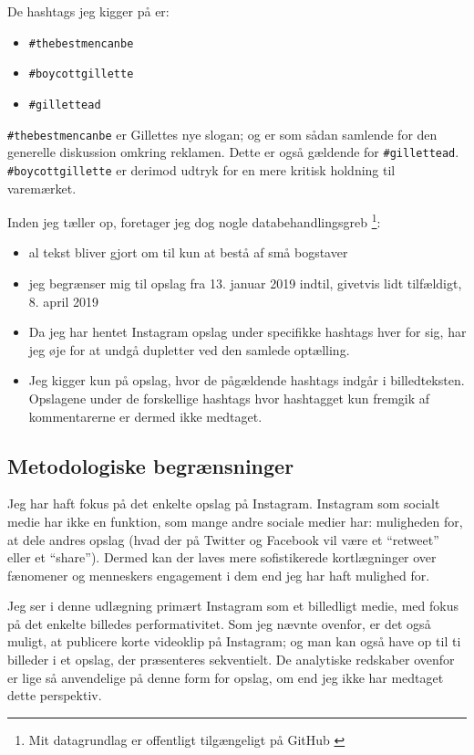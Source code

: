 De hashtags jeg kigger på er:
\begin{itemize}
    \item
        \texttt{\#thebestmencanbe}
    \item
        \texttt{\#boycottgillette}
    \item
        \texttt{\#gillettead}
\end{itemize}
\texttt{\#thebestmencanbe} er Gillettes nye slogan; og er som 
sådan samlende for den generelle diskussion omkring reklamen.  
Dette er også gældende for \texttt{\#gillettead}.  
\texttt{\#boycottgillette} er derimod udtryk for en mere kritisk 
holdning til varemærket.

Inden jeg tæller op, foretager jeg dog nogle databehandlingsgreb 
\footnote{Mit datagrundlag er offentligt tilgængeligt på GitHub 
\autocite{andersenEksamensopgaveSocialiseringOg2019}}:
\begin{itemize}
  \item
        al tekst bliver gjort om til kun at bestå af små bogstaver
    \item
        jeg begrænser mig til opslag fra 13. januar 2019 indtil, 
        givetvis lidt tilfældigt, 8. april 2019
    \item
        Da jeg har hentet Instagram opslag under specifikke 
        hashtags hver for sig, har jeg øje for at undgå dupletter 
        ved den samlede optælling.
    \item
        Jeg kigger kun på opslag, hvor de pågældende hashtags 
        indgår i billedteksten. Opslagene under de forskellige 
        hashtags hvor hashtagget kun fremgik af kommentarerne er 
        dermed ikke medtaget.
\end{itemize}

\subsection{Metodologiske begrænsninger}

Jeg har haft fokus på det enkelte opslag på Instagram. Instagram 
som socialt medie har ikke en funktion, som mange andre sociale 
medier har: muligheden for, at dele andres opslag (hvad der på 
Twitter og Facebook vil være et “retweet” eller et “share”).  
Dermed kan der laves mere sofistikerede kortlægninger over 
fænomener og menneskers engagement i dem end jeg har haft mulighed 
for.

Jeg ser i denne udlægning primært Instagram som et billedligt 
medie, med fokus på det enkelte billedes performativitet. Som jeg 
nævnte ovenfor, er det også muligt, at publicere korte videoklip 
på Instagram; og man kan også have op til ti billeder i et opslag, 
der præsenteres sekventielt. De analytiske redskaber ovenfor er 
lige så anvendelige på denne form for opslag, om end jeg ikke har 
medtaget dette perspektiv.


